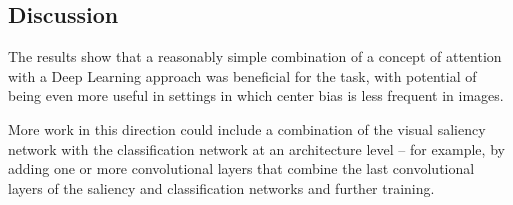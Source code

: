 \documentclass[English]{style/ic-tese-v3}
\begin{document}
\subsection{Discussion}
The results show that a reasonably simple combination of a concept of attention with a Deep Learning
approach was beneficial for the task, with potential of being even more useful in settings in which
center bias is less frequent in images.

More work in this direction could include a combination of the visual saliency network with
the classification network at an architecture level
-- for example, by adding one or more convolutional layers that combine the last convolutional layers
of the saliency and classification networks and further training.

\renewcommand\bibname{References\vspace*{10mm}}

\begingroup
\let\clearpage\relax


\endgroup
\end{document}
